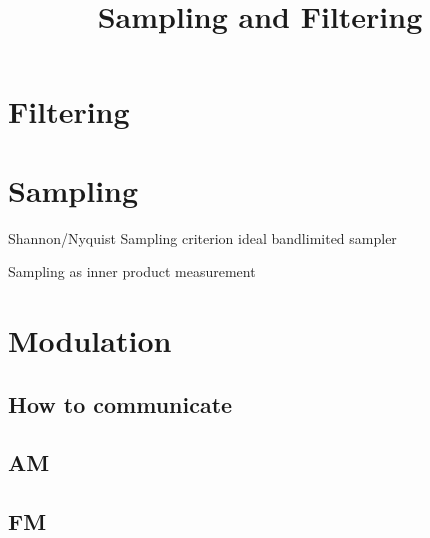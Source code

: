 

\title{Sampling and Filtering}

\maketitle



\section{Filtering}


\section{Sampling} 
Shannon/Nyquist Sampling criterion
ideal bandlimited sampler

Sampling as inner product measurement


\section{Modulation}

\subsection{How to communicate}

\subsection{AM}

\subsection{FM}





